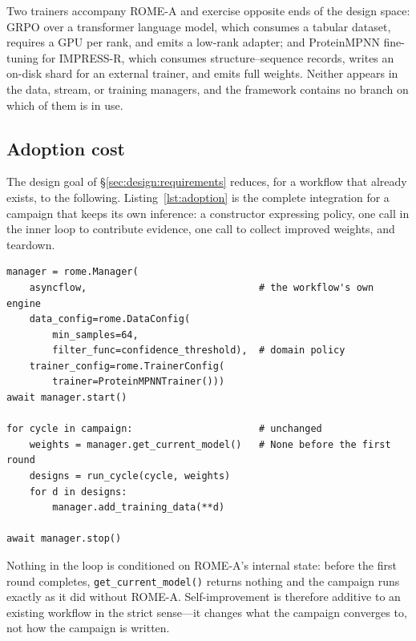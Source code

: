 Two trainers accompany ROME-A and exercise opposite ends of the design space:
GRPO over a transformer language model, which consumes a tabular dataset,
requires a GPU per rank, and emits a low-rank adapter; and ProteinMPNN
fine-tuning for IMPRESS-R, which consumes structure--sequence records, writes an
on-disk shard for an external trainer, and emits full weights. Neither appears
in the data, stream, or training managers, and the framework contains no branch
on which of them is in use.

\subsection{Adoption cost}
\label{sec:design:adoption}

The design goal of \S\ref{sec:design:requirements} reduces, for a workflow that
already exists, to the following. Listing~\ref{lst:adoption} is the complete
integration for a campaign that keeps its own inference: a constructor
expressing policy, one call in the inner loop to contribute evidence, one call
to collect improved weights, and teardown.

\begin{lstlisting}[style=rome, caption={Complete ROME-A integration for a
workflow that owns its own inference. The campaign's task graph is
unchanged.}, label={lst:adoption}]
manager = rome.Manager(
    asyncflow,                              # the workflow's own engine
    data_config=rome.DataConfig(
        min_samples=64,
        filter_func=confidence_threshold),  # domain policy
    trainer_config=rome.TrainerConfig(
        trainer=ProteinMPNNTrainer()))
await manager.start()

for cycle in campaign:                      # unchanged
    weights = manager.get_current_model()   # None before the first round
    designs = run_cycle(cycle, weights)
    for d in designs:
        manager.add_training_data(**d)

await manager.stop()
\end{lstlisting}

Nothing in the loop is conditioned on ROME-A's internal state: before the first
round completes, \texttt{get\_current\_model()} returns nothing and the campaign
runs exactly as it did without ROME-A. Self-improvement is therefore additive to
an existing workflow in the strict sense---it changes what the campaign
converges to, not how the campaign is written.
